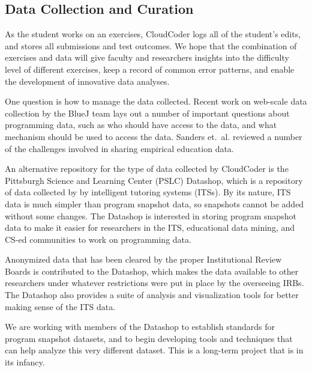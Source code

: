 \documentclass{sig-alternate}
\begin{document}
\subsection{Data Collection and Curation}

As the student works on an exercises, CloudCoder logs all of the
student's edits, and stores all submissions and test outcomes.
We hope that the combination of exercises and data will give faculty
and researchers
insights into the difficulty level of different exercises, keep a
record of common error patterns, and enable the development of
innovative data analyses.

One question is how to manage the data collected.  
Recent work on web-scale data collection by the
BlueJ team\cite{Utting:2012:WDG:2361276.2361278} lays out a number of important
questions about programming data, such as who should have access to the data, and what
mechanism should be used to access the data.  Sanders
et.\ al.\cite{Sanders:2008:DSE:1404520.1404534} reviewed a number of
the challenges involved in sharing empirical education data.  

An alternative repository for the type of data collected by CloudCoder
is the Pittsburgh Science and Learning Center (PSLC) Datashop, which
is a repository of data collected by by intelligent tutoring
systems (ITSs).  By its nature, ITS data is much simpler than program
snapshot data, so snapshots cannot be added without some changes.
The Datashop is interested in storing program
snapshot data to make it easier for researchers in the ITS, educational data
mining, and CS-ed communities to work on programming data.

Anonymized data that has been cleared by the proper Institutional
Review Boards is contributed to the Datashop, which
makes the data available to other researchers under whatever
restrictions were put in place by the overseeing IRBs.  The Datashop also
provides a suite of analysis and visualization tools for better making
sense of the ITS data.

We are working with members of the Datashop to establish standards for
program snapshot datasets, and to begin developing tools and
techniques that can help analyze this very different dataset.  This is
a long-term project that is in its infancy.

\end{document}
